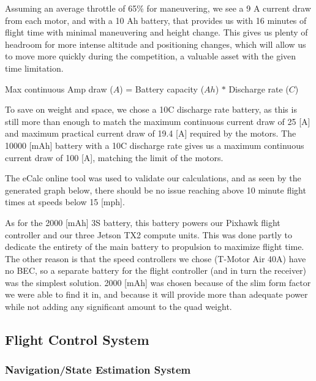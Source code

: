\documentclass[12pt,letterpaper]{article}
\begin{document}
Assuming an average throttle of 65\% for maneuvering, we see a 9 A current draw from each motor, and with a 10 Ah battery, that provides us with 16 minutes of flight time with minimal maneuvering and height change. This gives us plenty of headroom for more intense altitude and positioning changes, which will allow us to move more quickly during the competition, a valuable asset with the given time limitation.
\begin{center}
	Max continuous Amp draw ($A$) = Battery capacity ($Ah$) $*$ Discharge rate ($C$)
\end{center}

To save on weight and space, we chose a 10C discharge rate battery, as this is still more than enough to match the maximum continuous current draw of 25 [A] and maximum practical current draw of 19.4 [A] required by the motors. The 10000 [mAh] battery with a 10C discharge rate gives us a maximum continuous current draw of 100 [A], matching the limit of the motors.

The eCalc online tool was used to validate our calculations, and as seen by the generated graph below, there should be no issue reaching above 10 minute flight times at speeds below 15 [mph].


As for the 2000 [mAh] 3S battery, this battery powers our Pixhawk flight controller and our three Jetson TX2 compute units. This was done partly to dedicate the entirety of the main battery to propulsion to maximize flight time. The other reason is that the speed controllers we chose (T-Motor Air 40A) have no BEC, so a separate battery for the flight controller (and in turn the receiver) was the simplest solution. 2000 [mAh] was chosen because of the slim form factor we were able to find it in, and because it will provide more than adequate power while not adding any significant amount to the quad weight.

	\subsection*{Flight Control System}
		\subsubsection*{Navigation/State Estimation System}
		
\end{document}
